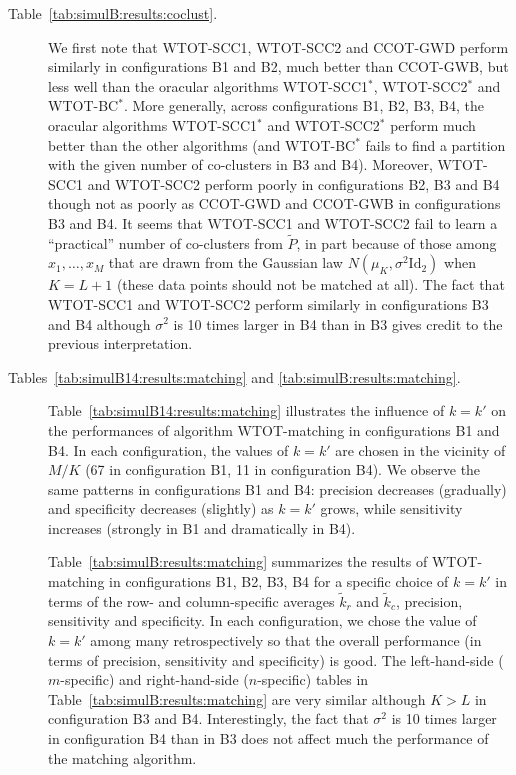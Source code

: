 \begin{description}
\item[Table~\ref{tab:simulB:results:coclust}.]  We first  note that WTOT-SCC1,
  WTOT-SCC2 and CCOT-GWD  perform similarly in configurations B1  and B2, much
  better  than   CCOT-GWB,  but  less   well  than  the   oracular  algorithms
  WTOT-SCC1$^*$,  WTOT-SCC2$^*$  and   WTOT-BC$^*$.   More  generally,  across
  configurations B1,  B2, B3,  B4, the  oracular algorithms  WTOT-SCC1$^*$ and
  WTOT-SCC2$^*$ perform much better than the other algorithms (and WTOT-BC$^*$
  fails to  find a partition  with the given number  of co-clusters in  B3 and
  B4).  Moreover, WTOT-SCC1 and WTOT-SCC2 perform poorly in configurations B2,
  B3 and B4 though not as poorly as CCOT-GWD and CCOT-GWB in configurations B3
  and B4.  It seems that WTOT-SCC1 and WTOT-SCC2 fail to learn a ``practical''
  number  of co-clusters  from $\tilde{P}$,  in  part because  of those  among
  $x_{1},   \ldots,   x_{M}$   that   are  drawn   from   the   Gaussian   law
  $N(\mu_{K},  \sigma^{2}  \text{Id}_{2})$  when $K=L+1$  (these  data  points
  should  not be  matched  at all).   The fact  that  WTOT-SCC1 and  WTOT-SCC2
  perform  similarly  in  configurations   B3  and  B4  although  $\sigma^{2}$
  is  10  times  larger in  B4  than  in  B3  gives credit  to  the  previous
  interpretation. 
\item[Tables~\ref{tab:simulB14:results:matching}                           and
  \ref{tab:simulB:results:matching}.]
  Table~\ref{tab:simulB14:results:matching}   illustrates  the   influence  of
  $k=k'$ on the  performances of algorithm WTOT-matching  in configurations B1
  and  B4. In  each configuration,  the  values of  $k=k'$ are  chosen in  the
  vicinity of  $M/K$ (67  in configuration  B1, 11  in configuration  B4).  We
  observe the same  patterns in configurations B1 and  B4: precision decreases
  (gradually)  and specificity  decreases  (slightly) as  $k=k'$ grows,  while
  sensitivity increases (strongly in B1 and dramatically in B4).

  Table~\ref{tab:simulB:results:matching}    summarizes    the   results    of
  WTOT-matching in  configurations B1,  B2, B3,  B4 for  a specific  choice of
  $k=k'$ in terms  of the row- and column-specific  averages $\tilde{k}_r$ and
  $\tilde{k}_c$,   precision,   sensitivity    and   specificity.    In   each
  configuration, we chose  the value of $k= k'$ among  many retrospectively so
  that  the  overall  performance  (in terms  of  precision,  sensitivity  and
  specificity) is good.  The left-hand-side ($m$-specific) and right-hand-side
  ($n$-specific)  tables in  Table~\ref{tab:simulB:results:matching} are  very
  similar although $K > L$ in configuration B3 and B4. Interestingly, the fact
  that $\sigma^{2}$ is 10 times larger in configuration B4 than in B3 does not
  affect much the performance of the matching algorithm.
\end{description}

